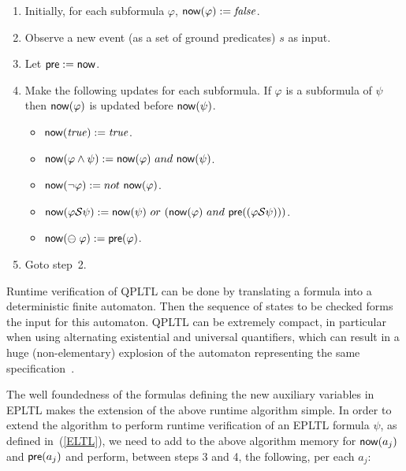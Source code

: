 \begin{enumerate}
\item Initially, for each subformula $\varphi$,
$\mathsf{now} ( \varphi ) := \mathit{false}$.
\item Observe a new event (as a set of ground predicates) $s$ as input. 
\item Let $\mathsf{pre} := \mathsf{now}$.
\item Make the following updates for each subformula. If $\varphi$ is
      a subformula of $\psi$ then $\mathsf{now} ( \varphi )$ is updated before 
      $\mathsf{now} ( \psi )$.

\begin{itemize}
  \item $\mathsf{now} ( \mathit{true} ) := \mathit{true}$.
  \item $\mathsf{now} (  \varphi \wedge \psi  ) := 
  \mathsf{now} ( \varphi )\  and\ \mathsf{now} ( \psi )$.
  \item $\current ( \neg \varphi  ) := not\ \current ( \varphi )$.
  \item $\current (  \varphi \since \psi  ) :=  
  \current ( \psi  )\ or\ ( \current ( \varphi ) \ and\ 
      \old ( ( \varphi \since  \psi )))$.
  \item $\mathsf{now} ( \ominus \; \varphi ) := \mathsf{pre} ( \varphi )$.
  
\end{itemize}
\item Goto step~2.
\end{enumerate}

Runtime verification of QPLTL can be done by translating a
formula into a deterministic finite automaton. Then the sequence of states to be checked forms the input for this automaton. QPLTL can be extremely compact, in particular when using alternating existential and universal 
quantifiers, which can result in a huge (non-elementary) explosion of
the automaton representing the same
specification~\cite{Thomas}.

The well foundedness of the formulas defining the new auxiliary variables in EPLTL makes the extension of the above
runtime algorithm simple.
In order to extend the algorithm to perform runtime verification of an EPLTL formula $\psi$, as defined in~(\ref{ELTL}),  we need to  add to the above
algorithm memory for $\mathsf{now} ( a_j )$ and $\mathsf{pre} ( a_j )$
and perform, between steps 3 and 4, the following, per each $a_j$: \\

